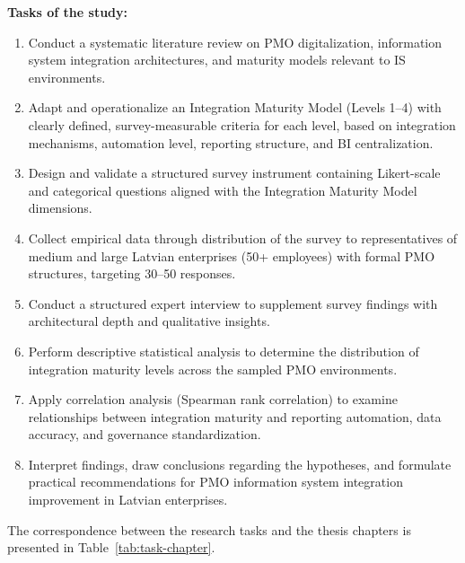 \textbf{Tasks of the study:}
\begin{enumerate}
    \item Conduct a systematic literature review on PMO digitalization, information
    system integration architectures, and maturity models relevant to IS environments.
    \item Adapt and operationalize an Integration Maturity Model (Levels 1--4) with
    clearly defined, survey-measurable criteria for each level, based on integration
    mechanisms, automation level, reporting structure, and BI centralization.
    \item Design and validate a structured survey instrument containing Likert-scale
    and categorical questions aligned with the Integration Maturity Model dimensions.
    \item Collect empirical data through distribution of the survey to representatives
    of medium and large Latvian enterprises (50+ employees) with formal PMO structures,
    targeting 30--50 responses.
    \item Conduct a structured expert interview to supplement survey findings with
    architectural depth and qualitative insights.
    \item Perform descriptive statistical analysis to determine the distribution of
    integration maturity levels across the sampled PMO environments.
    \item Apply correlation analysis (Spearman rank correlation) to examine relationships
    between integration maturity and reporting automation, data accuracy, and governance
    standardization.
    \item Interpret findings, draw conclusions regarding the hypotheses, and formulate
    practical recommendations for PMO information system integration improvement in
    Latvian enterprises.
\end{enumerate}

The correspondence between the research tasks and the thesis chapters is presented
in Table~\ref{tab:task-chapter}.

